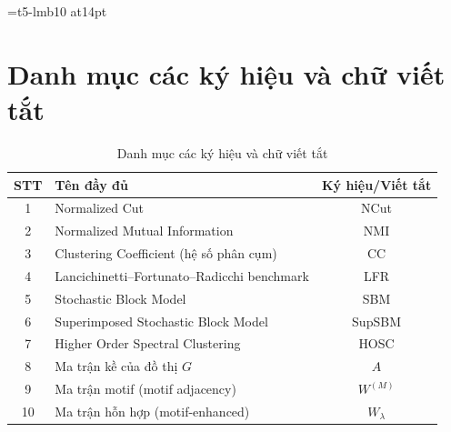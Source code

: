 \documentclass[13pt, a4paper, oneside]{book}
\makeatletter
\def\cleardoublepage{\clearpage\if@twoside \ifodd\c@page\else
    \hbox{}
    \thispagestyle{plain}
    \newpage
    \if@twocolumn\hbox{}\newpage\fi\fi\fi}
\numberwithin{subsection}{section}
\theoremstyle{definition}
\makeatother
\begin{document}
\font\chuong=t5-lmb10 at14pt%
\fontsize{14pt}{14pt}\selectfont%



\thispagestyle{plain}
\setcounter{page}{1}



\chapter*{Danh mục các ký hiệu và chữ viết tắt}
\baselineskip
21pt
\begin{table}[h!]
    \centering
    \begin{tabular}{|c|>{\arraybackslash}p{10cm}|c|}
        \hline
        \textbf{STT} & \centering\textbf{Tên đầy đủ} & \textbf{Ký hiệu/Viết tắt} \\ \hline
        1 & Normalized Cut & NCut \\ \hline
        2 & Normalized Mutual Information & NMI \\ \hline
        3 & Clustering Coefficient (hệ số phân cụm) & CC \\ \hline
        4 & Lancichinetti--Fortunato--Radicchi benchmark & LFR \\ \hline
        5 & Stochastic Block Model & SBM \\ \hline
        6 & Superimposed Stochastic Block Model & SupSBM \\ \hline
        7 & Higher Order Spectral Clustering & HOSC \\ \hline
        8 & Ma trận kề của đồ thị $G$ & $A$ \\ \hline
        9 & Ma trận motif (motif adjacency) & $W^{(M)}$ \\ \hline
        10 & Ma trận hỗn hợp (motif-enhanced) & $W_\lambda$ \\ \hline
    \end{tabular}
    \caption[]{Danh mục các ký hiệu và chữ viết tắt}
\end{table}

\newpage

\cleardoublepage

\renewcommand{\contentsname}{Mục lục}
\baselineskip 0.6cm
\tableofcontents
\thispagestyle{empty}
\end{document}
